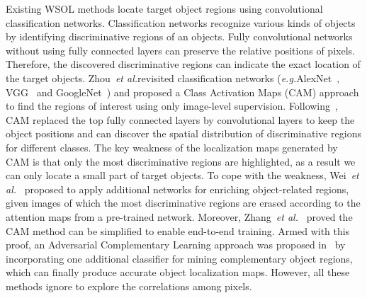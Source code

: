 \documentclass[runningheads]{llncs}
\newcommand{\etal}{\emph{et al.}}
\newcommand{\eg}{\emph{e.g.}}
\begin{document}
Existing WSOL methods locate target object regions using convolutional classification networks.
Classification networks recognize various kinds of objects by identifying discriminative regions of an objects.
Fully convolutional networks~\cite{2015-long} without using fully connected layers can preserve the relative positions of pixels. 
Therefore, the discovered discriminative regions can indicate the exact location of the target objects.
Zhou~\etal revisited classification networks (\eg AlexNet~\cite{krizhevsky2012imagenet}, VGG~\cite{simonyan2014very} and GoogleNet~\cite{szegedy2014going,szegedy2015going}) and proposed a Class Activation Maps (CAM) approach to find the regions of interest using only image-level supervision. 
Following~\cite{lin2013network}, CAM replaced the top fully connected layers by convolutional layers to keep the object positions and can discover the spatial distribution of discriminative regions for different classes.
The key weakness of the localization maps generated by CAM is that only the most discriminative regions are highlighted, as a result we can only locate a small part of target objects.
To cope with the weakness, Wei~\etal~\cite{wei2017object} proposed to apply additional networks for enriching object-related regions, given images of which the most discriminative regions are erased according to the attention maps from a pre-trained network. 
Moreover, 
Zhang~\etal~\cite{zhang2018adversarial} proved the CAM method can be simplified to enable end-to-end training. 
Armed with this proof, an Adversarial Complementary Learning approach was proposed in~\cite{zhang2018adversarial} by incorporating one additional classifier for mining complementary object regions, which can finally produce accurate object localization maps.
However, all these methods ignore to explore the correlations among pixels.
\end{document}
